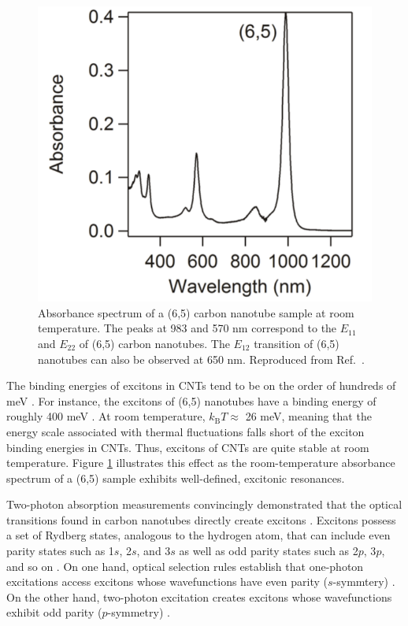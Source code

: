 \begin{figure}[ht]
	\centering
	\includegraphics[scale=0.62]{images/chapter_optical_props/cnt_absorbance_yota}
	\caption{Absorbance spectrum of a (6,5) carbon nanotube sample at room temperature. The peaks at 983 and 570 nm correspond to the $E_{11}$ and $E_{22}$ of (6,5) carbon nanotubes. The $E_{12}$ transition of (6,5) nanotubes can also be observed at 650 nm. Reproduced from Ref.\ \cite{ichinose2017extraction}. }
	\label{fig:cnt_abs_yota}
\end{figure}

The binding energies of excitons in CNTs tend to be on the order of hundreds of meV \cite{wang2005optical}. For instance, the excitons of (6,5) nanotubes have a binding energy of roughly 400 meV \cite{wang2005optical}. At room temperature, $k_\text{B} T \approx$ 26 meV, meaning that the energy scale associated with thermal fluctuations falls short of the exciton binding energies in CNTs. Thus, excitons of CNTs are quite stable at room temperature. Figure \ref{fig:cnt_abs_yota} illustrates this effect as the room-temperature absorbance spectrum of a (6,5) sample exhibits well-defined, excitonic resonances.

Two-photon absorption measurements convincingly demonstrated that the optical transitions found in carbon nanotubes directly create excitons \cite{maultzsch2005exciton, wang2005optical}. Excitons possess a set of Rydberg states, analogous to the hydrogen atom, that can include even parity states such as 1$s$, 2$s$, and 3$s$ as well as odd parity states such as 2$p$, 3$p$, and so on \cite{wang2005optical}. On one hand, optical selection rules establish that one-photon excitations access excitons whose wavefunctions have even parity ($s$-symmtery) \cite{wang2005optical}. On the other hand, two-photon excitation creates excitons whose wavefunctions exhibit odd parity ($p$-symmetry) \cite{wang2005optical}.

